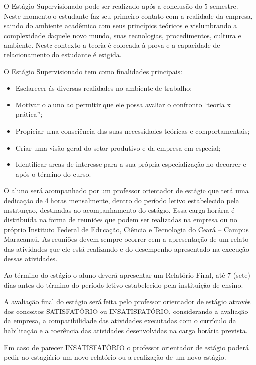 O Estágio Supervisionado pode ser realizado após a conclusão do 5{\r{}} semestre. Neste momento o estudante faz seu primeiro contato com a realidade da empresa, saindo do ambiente acadêmico com seus princípios teóricos e vislumbrando a complexidade daquele novo mundo, suas tecnologias, procedimentos, cultura e ambiente. Neste contexto a teoria é colocada à prova e a capacidade de relacionamento do estudante é exigida.

O Estágio Supervisionado tem como finalidades principais:

\begin{itemize}
	\item Esclarecer às diversas realidades no ambiente de trabalho;
	\item Motivar o aluno ao permitir que ele possa avaliar o confronto “teoria x prática”;
	\item Propiciar uma consciência das suas necessidades teóricas e comportamentais;
	\item Criar uma visão geral do setor produtivo e da empresa em especial;
	\item Identificar áreas de interesse para a sua própria especialização no decorrer e após o término do curso.
\end{itemize}

O aluno será acompanhado por um professor orientador de estágio que terá uma dedicação de 4 horas mensalmente, dentro do período letivo estabelecido pela instituição, destinadas ao acompanhamento do estágio. Essa carga horária é distribuída na forma de reuniões que podem ser realizadas na empresa ou no próprio Instituto Federal de Educação, Ciência e Tecnologia do Ceará – Campus Maracanaú. As reuniões devem sempre ocorrer com a apresentação de um relato das atividades que ele
está realizando e do desempenho apresentado na execução dessas atividades.

Ao término do estágio o aluno deverá apresentar um Relatório Final, até 7 (sete) dias antes do término do período letivo estabelecido pela instituição de ensino.

A avaliação final do estágio será feita pelo professor orientador de estágio através dos conceitos SATISFATÓRIO ou INSATISFATÓRIO, considerando a avaliação da empresa, a compatibilidade das atividades executadas com o currículo da habilitação e a coerência das atividades desenvolvidas na carga horária prevista.

Em caso de parecer INSATISFATÓRIO o professor orientador de estágio poderá pedir ao estagiário um novo relatório ou a realização de um novo estágio.

